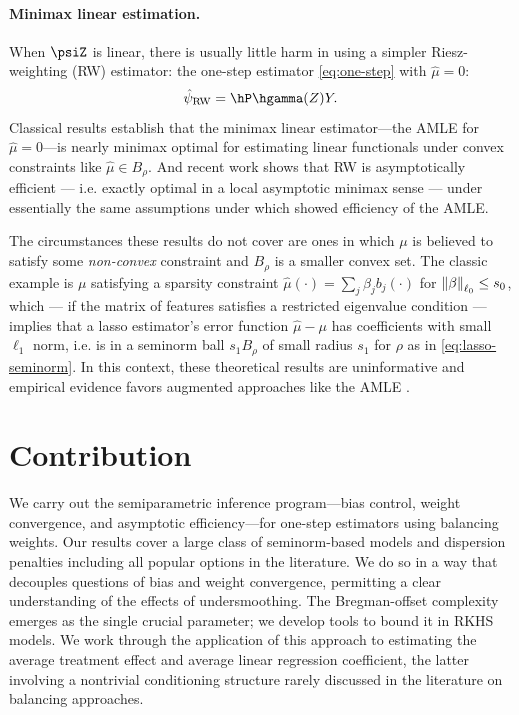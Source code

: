 \documentclass{article}
\begin{document}
\paragraph{Minimax linear estimation.}
When $\psiZ$ is linear, there is usually little harm in using a simpler Riesz-weighting (RW) estimator: the one-step estimator \eqref{eq:one-step} with $\hat\mu = 0$:
\[\hat\psi_{\text{RW}} = \hP \hgamma(Z) Y.\]
Classical results \citep{donoho1994statistical} establish that the minimax linear estimator---the AMLE for $\hat\mu=0$---is nearly minimax optimal for estimating linear functionals under convex constraints
like $\hat\mu \in B_\rho$. And recent work \citep{kong2025asymptotics} shows that RW is asymptotically efficient --- i.e. exactly optimal in a local asymptotic minimax sense --- under essentially the same assumptions under which \citet{hirshberg2018augmented} showed efficiency of the AMLE.

The circumstances these results do not cover are ones in which $\mu$ is believed to satisfy some \emph{non-convex} constraint and $B_\rho$ is a smaller convex set. The classic example is $\mu$ satisfying a sparsity constraint $\hat\mu(\cdot)=\sum_j \beta_j b_j(\cdot)$ for $\norm{\beta}_{\ell_0} \le s_0$, which --- if the matrix of features satisfies a restricted eigenvalue condition ---
implies that a lasso estimator's error function $\hat\mu-\mu$ has coefficients with small $\ell_1$ norm, i.e. is in a seminorm ball $s_1 B_\rho$ of small radius $s_1$ for $\rho$ as in \eqref{eq:lasso-seminorm}.  In this context, these theoretical results are uninformative and empirical evidence favors augmented approaches like the AMLE \citep{athey2018approximate}.

\section{Contribution}
\label{sec:contribution}

We carry out the semiparametric inference program---bias
control, weight convergence,
and asymptotic efficiency---for
one-step estimators using balancing weights.
Our results cover a large class
of seminorm-based models
and dispersion penalties
including all popular options in the literature.
We do so in a way that decouples
questions of bias and weight convergence,
permitting a clear understanding
of the effects of undersmoothing.
The Bregman-offset complexity emerges
as the single crucial parameter;
we develop tools to bound it
in RKHS models.
We work through the application
of this approach to estimating
the average treatment effect
and average linear regression coefficient,
the latter involving a nontrivial conditioning structure
rarely discussed in the literature
on balancing approaches.
\end{document}
